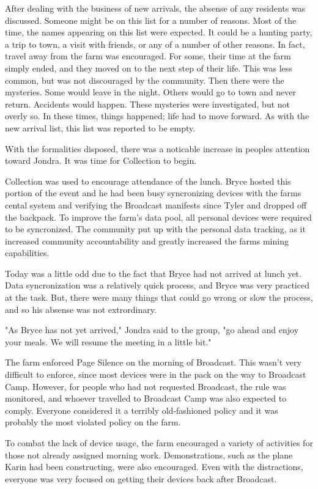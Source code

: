 \documentclass[courier]{sffms}
\begin{document}
After dealing with the business of new arrivals, the absense of any
residents was discussed. Someone might be on this list for a
number of reasons. Most of the time, the names appearing on this
list were expected. It could be a hunting party, a trip to town,
a visit with friends, or any of a number of other reasons. In fact,
travel away from the farm was encouraged. For some, their
time at the farm simply ended, and they moved on to the next step
of their life. This was less common, but was not discouraged by
the community. Then there were the mysteries. Some would
leave in the night. Others would go to town and never return.
Accidents would happen. These mysteries were investigated,
but not overly so. In these times, things happened; life had to
move forward. As with the new arrival list, this list was reported
to be empty.

With the formalities disposed, there was a noticable increase in
peoples attention toward Jondra. It was time for Collection to begin.

Collection was used to encourage attendance of the lunch.
Bryce hosted this portion of the event and he had been busy
syncronizing devices with the farms cental system and verifying
the Broadcast manifests since Tyler and dropped off the backpack.
To improve the farm's data pool, all
personal devices were required to be syncronized. The community
put up with the personal data tracking, as it increased
community accountability and greatly increased the farms
mining capabilities.

Today was a little odd due to the fact that Bryce had not arrived
at lunch yet. Data syncronization was a relatively
quick process, and Bryce was very practiced at the task. But,
there were many things that could go wrong or slow the
process, and so his absense was not extrordinary.

"As Bryce has not yet arrived,"
Jondra said to the group, "go ahead and enjoy your meals.
We will resume the meeting in a little bit."

The farm enforced Page Silence on the morning of
Broadcast. This wasn't very difficult to enforce, since most devices
were in the pack on the way to Broadcast Camp. However, for
people who had not requested Broadcast, the rule was monitored,
and whoever travelled to Broadcast Camp was also expected
to comply. Everyone considered it a terribly old-fashioned policy
and it was probably the most violated policy on the farm.

To combat the lack of device usage, the farm encouraged a variety
of activities for those not already assigned morning work.
Demonstrations, such as the plane Karin had been constructing,
were also encouraged. Even with the distractions, everyone
was very focused on getting their devices back after Broadcast.
\end{document}
